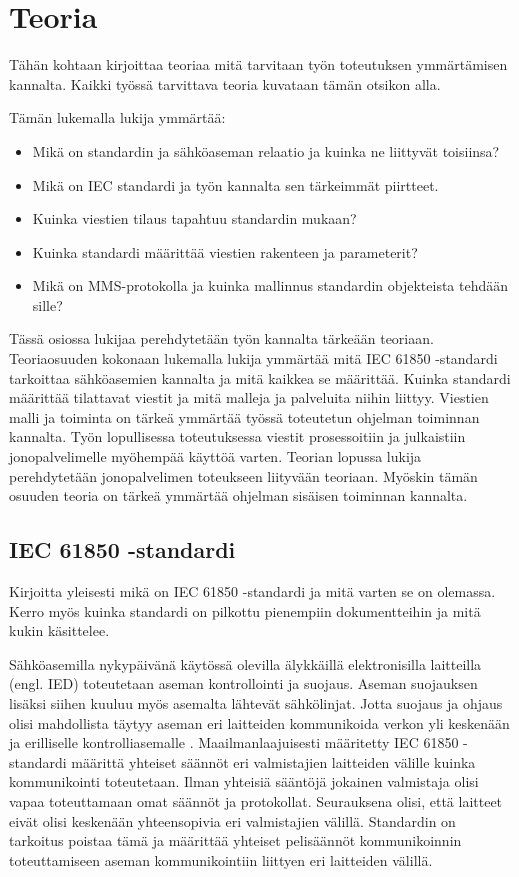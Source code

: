 \chapter{Teoria}
\label{ch:teoria}
\begin{it}
	Tähän kohtaan kirjoittaa teoriaa mitä tarvitaan työn toteutuksen ymmärtämisen kannalta. Kaikki työssä tarvittava teoria kuvataan tämän otsikon alla.

	Tämän lukemalla lukija ymmärtää:
	\begin{itemize}
		\item Mikä on standardin ja sähköaseman relaatio ja kuinka ne liittyvät toisiinsa?
		\item Mikä on IEC standardi ja työn kannalta sen tärkeimmät piirtteet.
		\item Kuinka viestien tilaus tapahtuu standardin mukaan?
		\item Kuinka standardi määrittää viestien rakenteen ja parameterit?
		\item Mikä on MMS-protokolla ja kuinka mallinnus standardin objekteista tehdään sille?
	\end{itemize}
\end{it}

Tässä osiossa lukijaa perehdytetään työn kannalta tärkeään teoriaan. Teoriaosuuden kokonaan lukemalla lukija ymmärtää mitä IEC 61850 -standardi tarkoittaa sähköasemien kannalta ja mitä kaikkea se määrittää. Kuinka standardi määrittää tilattavat viestit ja mitä malleja ja palveluita niihin liittyy. Viestien malli ja toiminta on tärkeä ymmärtää työssä toteutetun ohjelman toiminnan kannalta. Työn lopullisessa toteutuksessa viestit prosessoitiin ja julkaistiin jonopalvelimelle myöhempää käyttöä varten. Teorian lopussa lukija perehdytetään jonopalvelimen toteukseen liityvään teoriaan. Myöskin tämän osuuden teoria on tärkeä ymmärtää ohjelman sisäisen toiminnan kannalta.

\section{IEC 61850 -standardi}
\begin{it}
	Kirjoitta yleisesti mikä on IEC 61850 -standardi ja mitä varten se on olemassa. Kerro myös kuinka standardi on pilkottu pienempiin dokumentteihin ja mitä kukin käsittelee.
\end{it}

Sähköasemilla nykypäivänä käytössä olevilla älykkäillä elektronisilla laitteilla (engl. IED) toteutetaan aseman kontrollointi ja suojaus. Aseman suojauksen lisäksi siihen kuuluu myös asemalta lähtevät sähkölinjat. Jotta suojaus ja ohjaus olisi mahdollista täytyy aseman eri laitteiden kommunikoida verkon yli keskenään ja erilliselle kontrolliasemalle \cite[s.~1]{Brunner2008}. Maailmanlaajuisesti määritetty IEC 61850 -standardi määrittä yhteiset säännöt eri valmistajien laitteiden välille kuinka kommunikointi toteutetaan. Ilman yhteisiä sääntöjä jokainen valmistaja olisi vapaa toteuttamaan omat säännöt ja protokollat. Seurauksena olisi, että laitteet eivät olisi keskenään yhteensopivia eri valmistajien välillä. Standardin on tarkoitus poistaa tämä ja määrittää yhteiset pelisäännöt kommunikoinnin toteuttamiseen aseman kommunikointiin liittyen eri laitteiden välillä.

